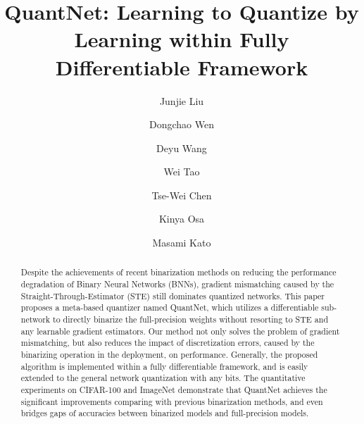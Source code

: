 \documentclass[runningheads]{llncs}
\begin{document}
\pagestyle{headings}
\mainmatter
\def\ECCVSubNumber{8}  

\title{QuantNet: Learning to Quantize by Learning within Fully Differentiable Framework} 

\begin{comment}
\titlerunning{ECCV-20 submission ID \ECCVSubNumber}
\authorrunning{ECCV-20 submission ID \ECCVSubNumber}
\author{Anonymous ECCV submission}
\institute{Paper ID \ECCVSubNumber}
\end{comment}


\author{Junjie Liu\and
Dongchao Wen \and
Deyu Wang\and
Wei Tao\and
Tse-Wei Chen\and
Kinya Osa\and
Masami Kato}
\maketitle

\begin{abstract}
Despite the achievements of recent binarization methods on
reducing the performance degradation of Binary Neural Networks (BNNs),
gradient mismatching caused by the Straight-Through-Estimator (STE) still dominates quantized networks.
This paper proposes a meta-based quantizer named QuantNet,
which utilizes a differentiable sub-network to directly binarize the full-precision weights without resorting to STE and any learnable gradient estimators.
Our method not only solves the problem of gradient mismatching,
but also reduces the impact of discretization errors, caused by the binarizing operation in the deployment, on performance.
Generally, the proposed algorithm is implemented within a fully differentiable framework,
and is easily extended to the general network quantization with any bits.
The quantitative experiments on CIFAR-100 and ImageNet demonstrate that
QuantNet achieves the significant improvements comparing with previous binarization methods,
and even bridges gaps of accuracies between binarized models and full-precision models.
\end{abstract}
\end{document}
